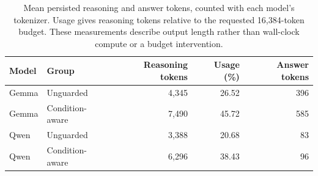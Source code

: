 \begin{table}[t]
\centering
\caption{Mean persisted reasoning and answer tokens, counted with each model's tokenizer. Usage gives reasoning tokens relative to the requested 16,384-token budget. These measurements describe output length rather than wall-clock compute or a budget intervention.}
\label{tab:token-observability}
\scriptsize
\setlength{\tabcolsep}{3pt}
\begin{tabular}{llrrr}
\toprule
Model & Group & Reasoning tokens & Usage (\%) & Answer tokens \\
\midrule
Gemma & Unguarded & 4,345 & 26.52 & 396 \\
Gemma & Condition-aware & 7,490 & 45.72 & 585 \\
Qwen & Unguarded & 3,388 & 20.68 & 83 \\
Qwen & Condition-aware & 6,296 & 38.43 & 96 \\
\bottomrule
\end{tabular}

\end{table}

